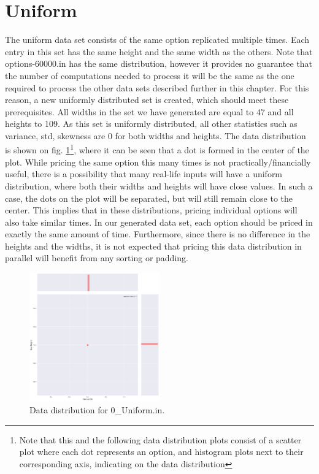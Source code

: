 \section{Uniform}
The uniform data set consists of the same option replicated multiple times. Each entry in this set has the same height and the same width as the others. Note that options-60000.in has the same distribution, however it provides no guarantee that the number of computations needed to process it will be the same as the one required to process the other data sets described further in this chapter. For this reason, a new uniformly distributed set is created, which should meet these prerequisites. All widths in the set we have generated are equal to 47 and all heights to 109. As this set is uniformly distributed, all other statistics such as variance, std, skewness are 0 for both widths and heights. The data distribution is shown on fig. \ref{fig:data:uniform}\footnote{Note that this and the following data distribution plots consist of a scatter plot where each dot represents an option, and histogram plots next to their corresponding axis, indicating on the data distribution}, where it can be seen that a dot is formed in the center of the plot. While pricing the same option this many times is not practically/financially useful, there is a possibility that many real-life inputs will have a uniform distribution, where both their widths and heights will have close values. In such a case, the dots on the plot will be separated, but will still remain close to the center. This implies that in these distributions, pricing individual options will also take similar times. In our generated data set, each option should be priced in exactly the same amount of time. Furthermore, since there is no difference in the heights and the widths, it is not expected that pricing this data distribution in parallel will benefit from any sorting or padding.   
 
 \begin{figure}[H]
	\centering
	\includegraphics[width=0.5\textwidth]{img/0_UNIFORM_plot.png}
	\caption{Data distribution for 0\_Uniform.in.}
	\label{fig:data:uniform}
\end{figure}

